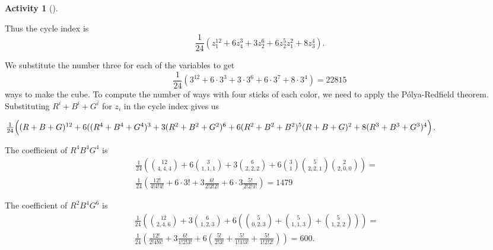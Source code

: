 \documentclass[10pt,]{book}
\theoremstyle{plain}
\theoremstyle{definition}
\newtheorem{activity}[project]{Activity}
\numberwithin{equation}{chapter}
\newcommand{\amp}{&}
\begin{document}
\begin{activity}[]
\begin{enumerate}[label=(\alph*)]
\end{enumerate}
Thus the cycle index is%
\begin{equation*}
\frac{1}{24}\left(z_1^{12}+6z_4^3+3z_2^6+6z_2^5z_1^2 + 8z_3^4\right).
\end{equation*}
%
\par
We substitute the number three for each of the variables to get%
\begin{equation*}
\frac{1}{24}\left(3^{12}+6\cdot 3^3+3\cdot3^6+6\cdot 3^7 +8\cdot3^4\right)=22815
\end{equation*}
ways to make the cube. To compute the number of ways with four sticks of each color, we need to apply the Pólya-Redfield theorem. Substituting \(R^i+B^i+G^i\) for \(z_i\) in the cycle index gives us%
\par
\(\frac{1}{24}\Big((R+B+G)^{12}+6((R^4+B^4+G^4)^3+3(R^2+B^2+G^2)^6+\\6(R^2+B^2+B^2)^5(R+B+G)^2
+8(R^3+B^3+G^3)^4\Big)\).%
\par
The coefficient of \(R^4B^4G^4\) is%
\begin{align*}
\frac{1}{24}\left(\binom{12}{4,4,4}+6\binom{3}{1,1,1}+3\binom{6}{2,2,2}+
6\binom{3}{1}\binom{5}{2,2,1}\binom{2}{2,0,0}
\right) =\amp\\
\frac{1}{24}\left(\frac{12!}{4!4!4!}+6\cdot3!+3\frac{6!}{2!2!2!}+6\cdot3\frac{5!}{2!2!1!}\right)=1479 \amp
\end{align*}
%
\par
The coefficient of \(R^2B^4G^6\) is%
\begin{align*}
\frac{1}{24}\left(\binom{12}{2,4,6}
+3\binom{6}{1,2,3}+6\left(\binom{5}{0,2,3}+\binom{5}{1,1,3}+\binom{5}{1,2,2}\right)\right) =\amp\\
\frac{1}{24}\left(\frac{12!}{2!4!6!}+3\frac{6!}{1!2!3!}+6\left(\frac{5!}{2!3!}+\frac{5!}{1!1!3!}
+\frac{5!}{1!2!2!}\right)\right)=600.
\end{align*}
%
\end{activity}
\end{document}
